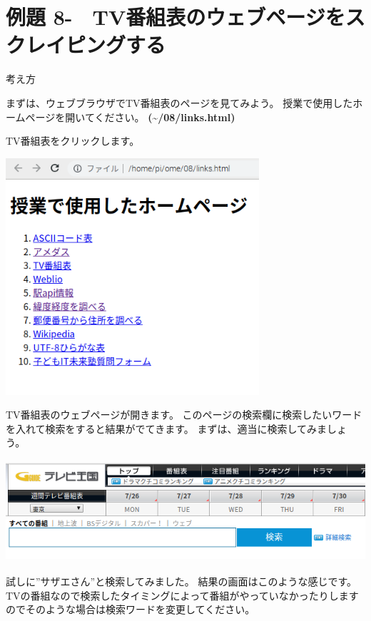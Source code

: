 \documentclass[a4paper,12pt,dvipdfmx]{jarticle}
\newcounter{Exercise}
\renewcommand\theExercise{例題 8-\arabic{Exercise}}
\begin{document}
\bigskip


\bigskip

\clearpage\section*{\theExercise　TV番組表のウェブページをスクレイピングする}
\addtocounter{Exercise}{-1}\label{E:TV}
考え方

まずは、ウェブブラウザでTV番組表のページを見てみよう。
授業で使用したホームページを開いてください。
\textbf{(\~{}/08/links.html)}

TV番組表をクリックします。 



\begin{center}
\includegraphics[width=9.398cm,height=8.784cm]{textbook-img017.png}

\end{center}


\bigskip


\bigskip

TV番組表のウェブページが開きます。
このページの検索欄に検索したいワードを入れて検索をすると結果がでてきます。
まずは、適当に検索してみましょう。



\begin{center}
\includegraphics[width=14.099cm,height=3.768cm]{textbook-img041.png}

\end{center}
\clearpage
試しに”サザエさん”と検索してみました。
結果の画面はこのような感じです。
TVの番組なので検索したタイミングによって番組がやっていなかったりしますのでそのような場合は検索ワードを変更してください。
\end{document}

